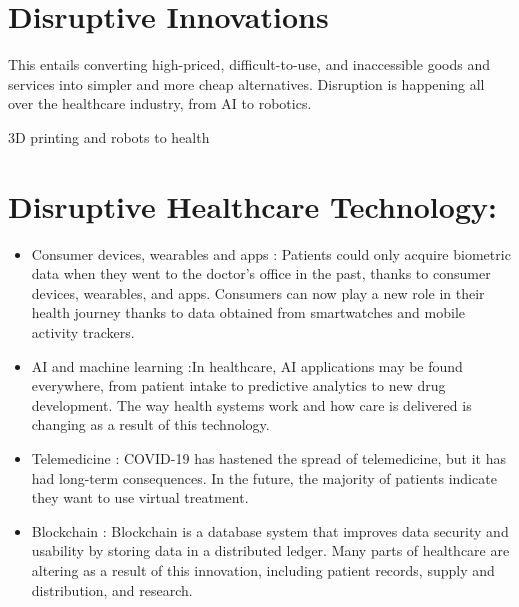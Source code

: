 \documentclass[12pt]{article}
\begin{document}
\section*{ \Large Disruptive Innovations }
\raggedright \Large This entails converting high-priced, difficult-to-use, and inaccessible goods and services into simpler and more cheap alternatives.
Disruption is happening all over the healthcare industry, from AI to robotics.

3D printing and robots to health
\\
\section*{Disruptive Healthcare Technology:}
\begin{itemize}
 \item Consumer devices, wearables and apps : Patients could only acquire biometric data when they went to the doctor's office in the past, thanks to consumer devices, wearables, and apps. Consumers can now play a new role in their health journey thanks to data obtained from smartwatches and mobile activity trackers.
 
 \item AI and machine learning :In healthcare, AI applications may be found everywhere, from patient intake to predictive analytics to new drug development. The way health systems work and how care is delivered is changing as a result of this technology.

\item Telemedicine : COVID-19 has hastened the spread of telemedicine, but it has had long-term consequences. In the future, the majority of patients indicate they want to use virtual treatment.

\item Blockchain : Blockchain is a database system that improves data security and usability by storing data in a distributed ledger. Many parts of healthcare are altering as a result of this innovation, including patient records, supply and distribution, and research.

\end{itemize}
\end{document}
